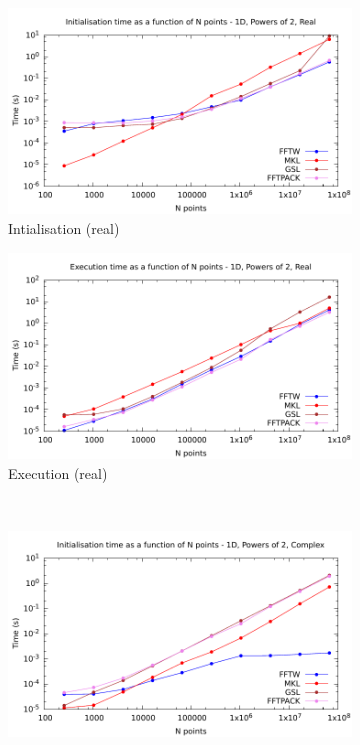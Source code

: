\documentclass[12pt, a4paper]{article}
\begin{document}
\begin{figure}[H]
\captionsetup{width=0.8\linewidth}
\centering
\begin{subfigure}{.5\textwidth}
\centering
\includegraphics[width=.9\linewidth]{graphs/1d-pow2-init-r.pdf}
\caption{Intialisation (real)}
\label{1DPOW2RI}
\end{subfigure}%
\begin{subfigure}{.5\textwidth}
\centering
\includegraphics[width=.9\linewidth]{graphs/1d-pow2-exec-r.pdf}
\caption{Execution (real)}
\label{1DPOW2R}
\end{subfigure}\\
\begin{subfigure}{.5\textwidth}
\centering
\includegraphics[width=.9\linewidth]{graphs/1d-pow2-init-c.pdf}

\end{subfigure}
\end{figure}
\end{document}
